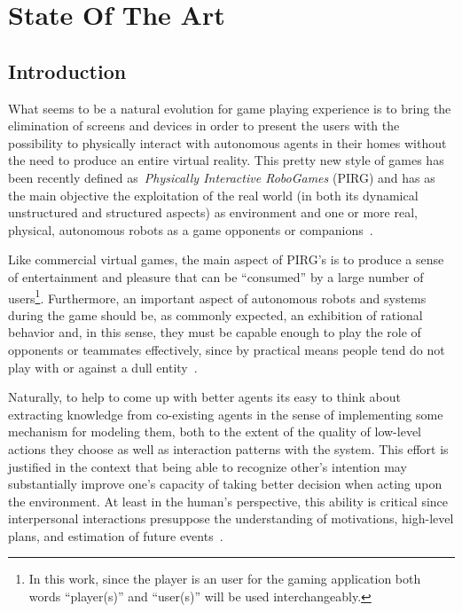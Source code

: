\chapter{State Of The Art}

\section{Introduction}
What seems to be a natural evolution for game playing experience is to bring the elimination of screens and devices in order to present the users with the possibility to physically interact with autonomous agents in their homes without the need to produce an entire virtual reality. This pretty new style of games has been recently defined as~\textit{Physically Interactive RoboGames} (PIRG) and has as the main objective the exploitation of the real world (in both its dynamical unstructured and structured aspects) as environment and one or more real, physical, autonomous robots as a game opponents or companions~\cite{martinoia_physically_2013}.

Like commercial virtual games, the main aspect of PIRG's is to produce a sense of entertainment and pleasure that can be ``consumed'' by a large number of users\footnote{In this work, since the player is an user for the gaming application both words ``player(s)'' and ``user(s)'' will be used interchangeably.}. Furthermore, an important aspect of autonomous robots and systems during the game should be, as commonly expected, an exhibition of rational behavior and, in this sense, they must be capable enough to play the role of opponents or teammates effectively, since by practical means people tend do not play with or against a dull entity~\cite{martinoia_physically_2013}.

Naturally, to help to come up with better agents its easy to think about extracting knowledge from co-existing agents in the sense of implementing some mechanism for modeling them, both to the extent of the quality of low-level actions they choose as well as interaction patterns with the system. This effort is justified in the context that being able to recognize other's intention may substantially improve one's capacity of taking better decision when acting upon the environment.  At least in the human's perspective, this ability is critical since interpersonal interactions presuppose the understanding of motivations, high-level plans, and estimation of future events~\cite{tagkey2014i}.

